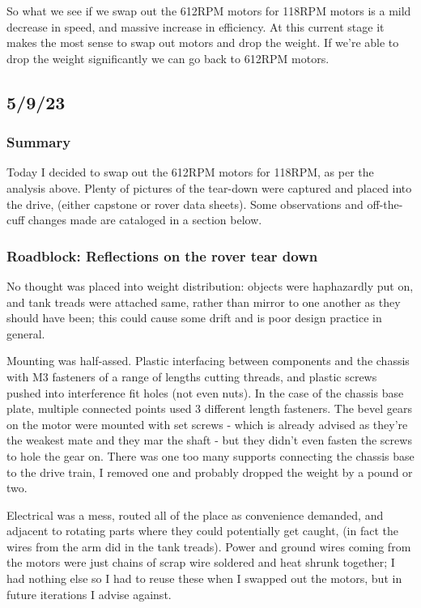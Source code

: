 \documentclass[a4paper, 10pt]{article}
\begin{document}
		So what we see if we swap out the 612RPM motors for 118RPM motors is a mild decrease in speed, and massive increase in efficiency. At this current stage it makes the most sense to swap out motors and drop the weight. If we're able to drop the weight significantly we can go back to 612RPM motors. 
		
	\subsection{5/9/23}
		\subsubsection{Summary}
		Today I decided to swap out the 612RPM motors for 118RPM, as per the analysis above. Plenty of pictures of the tear-down were captured and placed into the drive, (either capstone or rover data sheets). Some observations and off-the-cuff changes made are cataloged in a section below.
		
		\subsubsection{Roadblock: Reflections on the rover tear down}
		No thought was placed into weight distribution: objects were haphazardly put on, and tank treads were attached same, rather than mirror to one another as they should have been; this could cause some drift and is poor design practice in general. 
		
		Mounting was half-assed. Plastic interfacing between components and the chassis with M3 fasteners of a range of lengths cutting threads, and plastic screws pushed into interference fit holes (not even nuts). In the case of the chassis base plate, multiple connected points used 3 different length fasteners. The bevel gears on the motor were mounted with set screws - which is already advised as they're the weakest mate and they mar the shaft - but they didn't even fasten the screws to hole the gear on. There was one too many supports connecting the chassis base to the drive train, I removed one and probably dropped the weight by a pound or two. 
		
		Electrical was a mess, routed all of the place as convenience demanded, and adjacent to rotating parts where they could potentially get caught, (in fact the wires from the arm did in the tank treads). Power and ground wires coming from the motors were just chains of scrap wire soldered and heat shrunk together; I had nothing else so I had to reuse these when I swapped out the motors, but in future iterations I advise against.
		
\end{document}
